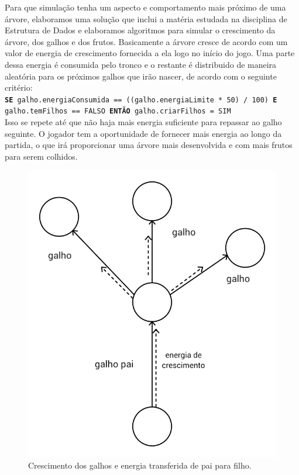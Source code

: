 \documentclass[12pt]{article}
\begin{document}
Para que simula\c c\~ao tenha um aspecto e comportamento mais pr\'oximo de uma \'arvore, elaboramos uma solu\c c\~ao que inclui
a mat\'eria estudada na disciplina de Estrutura de Dados e elaboramos algoritmos para simular o crescimento da \'arvore,
dos galhos e dos frutos. Basicamente a \'arvore cresce de acordo com um valor de energia de crescimento fornecida
a ela logo no in\'icio do jogo. Uma parte dessa energia \'e consumida pelo tronco e o restante \'e distribuido
de maneira aleat\'oria para os pr\'oximos galhos que ir\~ao nascer, de acordo com o seguinte crit\'erio: \\

 \texttt{\footnotesize{\textbf{SE} galho.energiaConsumida == ((galho.energiaLimite * 50) / 100) \textbf{E} galho.temFilhos == FALSO 
        \textbf{ENT\~AO} galho.criarFilhos = SIM}} \\


Isso se repete at\'e que n\~ao haja mais energia suficiente
para repassar ao galho seguinte. O jogador tem a oportunidade de fornecer mais energia ao longo da partida, o que
ir\'a proporcionar uma \'arvore mais desenvolvida e com mais frutos para serem colhidos.

	\begin{figure}[ht!]
	\begin{center}
		\includegraphics[scale=0.2]{img/PI3_Ponto_Crescimento.png}
		\caption{\footnotesize {Crescimento dos galhos e energia transferida de pai para filho.} }
	\end{center}
	\end{figure}	
	
\end{document}
